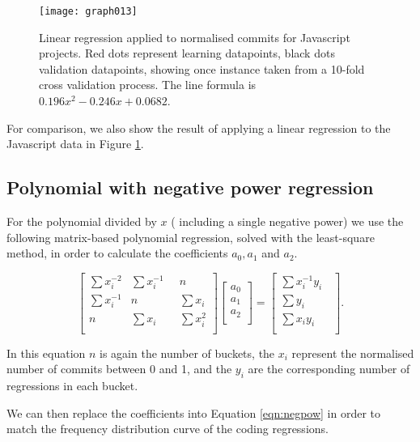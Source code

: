 \documentclass[10pt,journal,compsoc]{IEEEtran}
\begin{document}
\begin{figure}[t]
\centering
\texttt{[image: graph013]}%
\caption{\label{fig:javascript-linear}Linear regression applied to normalised commits for Javascript projects. Red dots represent learning datapoints, black dots validation datapoints, showing once instance taken from a 10-fold cross validation process. The line formula is $0.196x^{2} - 0.246x + 0.0682$.}
\end{figure}


For comparison, we also show the result of applying a linear regression to the Javascript data in Figure \ref{fig:javascript-linear}.

\subsection{Polynomial with negative power regression}

For the polynomial divided by $x$ (\ie\/ including a single negative power) we use the following matrix-based polynomial regression, solved with the least-square method, in order to calculate the coefficients $a_0, a_1$ and $a_2$.

\begin{equation}
\begin{bmatrix}
\sum x_i^{-2} & \sum x_i^{-1}        & n            \\
\sum x_i^{-1} & n                    & \sum x_i     \\
n             & \sum x_i \phantom{-} & \sum x_i^{2} \\
\end{bmatrix}
\begin{bmatrix}
a_0 \\
a_1 \\
a_2 \\
\end{bmatrix}
=
\begin{bmatrix}
\sum x_i^{-1} y_i        \\
\sum y_i \phantom{x_i -} \\
\sum x_i y_i \phantom{-} \\
\end{bmatrix}.
\end{equation}

In this equation $n$ is again the number of buckets, the $x_i$ represent the normalised number of commits between 0 and 1, and the $y_i$ are the corresponding number of regressions in each bucket.

We can then replace the coefficients into Equation \ref{eqn:negpow} in order to match the frequency distribution curve of the coding regressions.
\end{document}
